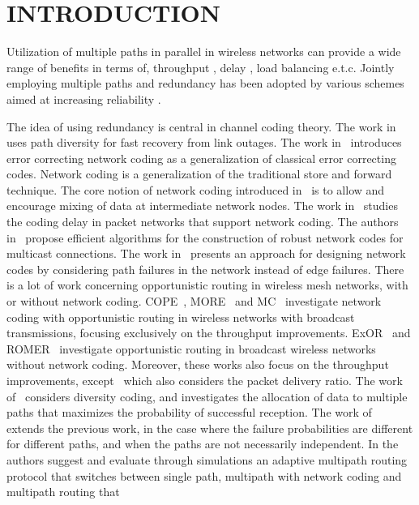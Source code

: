 \documentclass[journal, onecolumn, 12pt]{IEEEtran}
\begin{document}
\section{\uppercase{Introduction}}
\label{sec:introd}

Utilization of multiple paths in parallel in wireless networks can provide a wide range of benefits in terms of, throughput \cite{6133896}, delay \cite{mp_route_wim}, load balancing \cite{5198989} e.t.c.
Jointly employing multiple paths and redundancy has been adopted by various schemes aimed at increasing reliability \cite{Oh:2009:RMR:1702135.1702167}.

The idea of using redundancy is central in channel coding theory.
The work in~\cite{b:divcod} uses path diversity for fast recovery from link outages.
The work in~\cite{b:yeungerrcorr} introduces error correcting network coding as a generalization of classical error correcting codes.
Network coding is a generalization of the traditional store and forward technique.
The core notion of network coding introduced in~\cite{b:yeung} is to allow and encourage mixing of data at intermediate network nodes.
The work in~\cite{b:lun} studies the coding delay in packet networks that support network coding.
The authors in~\cite{b:designeffrobnet} propose efficient algorithms for the construction of robust network codes for multicast connections.
The work in~\cite{b:robnetcodpathfailure} presents an approach for designing network codes by considering path failures in the network instead of edge failures.
There is a lot of work concerning opportunistic routing in wireless mesh networks, with or without network coding.
COPE~\cite{b:cope}, MORE~\cite{b:more} and MC~\cite{b:mc2} investigate network coding with opportunistic routing in wireless networks with broadcast transmissions, focusing exclusively on the throughput improvements.
ExOR~\cite{b:exor} and ROMER~\cite{b:romer} investigate opportunistic routing in broadcast wireless networks without network coding.
Moreover, these works also focus on the throughput improvements, except~\cite{b:romer} which also considers the packet delivery ratio.
The work of~\cite{b:tsirig1} considers diversity coding, and investigates the allocation of data to multiple paths that maximizes the probability of successful reception.
The work of~\cite{b:tsirig2} extends the previous work, in the case where the failure probabilities are different for different paths, and when the paths are not necessarily independent.
In \cite{Oh:2009:RMR:1702135.1702167} the authors suggest and evaluate through simulations an adaptive multipath routing protocol that switches between single path, multipath with network coding and multipath routing that
\end{document}
